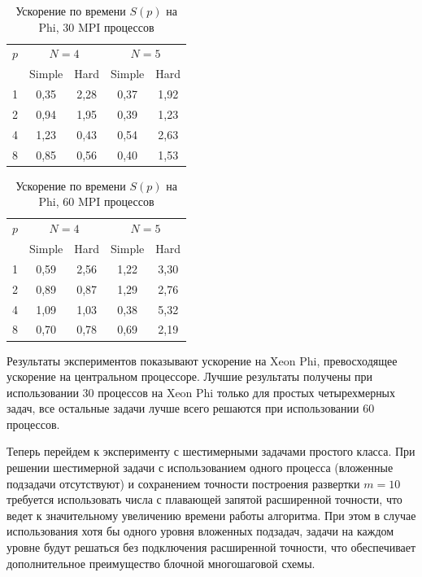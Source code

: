 \documentclass[a4paper]{article}
\begin{document}
\begin{table}
    \centering
    \begin{tabular}{|c|c|c|c|c|}
    \hline
    \(p\) & \multicolumn{2}{|c|}{\(N=4\)} & \multicolumn{2}{|c|}{\(N=5\)}\\ \cline{2-5}
    & Simple & Hard & Simple & Hard \\ \hline
	1 & 0,35 & 2,28 & 0,37 & 1,92 \\ \hline
	2 & 0,94 & 1,95 & 0,39 & 1,23 \\ \hline
	4 & 1,23 & 0,43 & 0,54 & 2,63 \\ \hline
	8 & 0,85 & 0,56 & 0,40 & 1,53 \\ \hline
	\end{tabular}
    \caption{Ускорение по времени \(S(p)\) на Phi, 30 MPI процессов}
    \label{table:time_speedUp_phi_30mpi_easy}
\end{table}
\begin{table}
    \centering
    \begin{tabular}{|c|c|c|c|c|}
    \hline
    \(p\) & \multicolumn{2}{|c|}{\(N=4\)} & \multicolumn{2}{|c|}{\(N=5\)}\\ \cline{2-5}
    & Simple & Hard & Simple & Hard \\ \hline
	1 & 0,59 & 2,56 & 1,22 & 3,30 \\ \hline
	2 & 0,89 & 0,87 & 1,29 & 2,76 \\ \hline
	4 & 1,09 & 1,03 & 0,38 & 5,32 \\ \hline
	8 & 0,70 & 0,78 & 0,69 & 2,19 \\ \hline
	\end{tabular}
    \caption{Ускорение по времени \(S(p)\) на Phi, 60 MPI процессов}
    \label{table:time_speedUp_phi_60mpi_easy}
\end{table}
\par
Результаты экспериментов показывают ускорение на Xeon Phi, превосходящее ускорение на центральном процессоре. Лучшие результаты получены при использовании 30 процессов на Xeon Phi только для простых четырехмерных задач, все остальные задачи лучше всего решаются при использовании 60 процессов.
\par
Теперь перейдем к эксперименту с шестимерными задачами простого класса. При решении шестимерной задачи с использованием одного процесса (вложенные подзадачи отсутствуют) и сохранением точности построения развертки \(m=10\) требуется использовать числа с плавающей запятой расширенной точности, что ведет к значительному увеличению времени работы алгоритма. При этом в случае использования хотя бы одного уровня вложенных подзадач, задачи на каждом уровне будут решаться без подключения расширенной точности, что обеспечивает дополнительное преимущество блочной многошаговой схемы.
\end{document}
